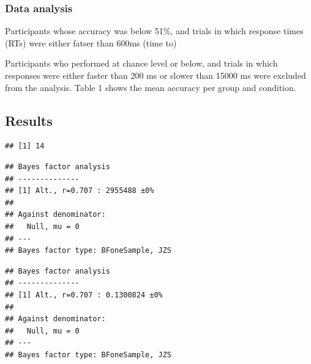 \documentclass[
  english,
  man]{apa7}
\begin{document}
\hypertarget{data-analysis}{%
\subsubsection{Data analysis}\label{data-analysis}}

Participants whose accuracy was below 51\%, and trials in which response times (RTs) were either fatser than 600ms (time to)

Participants who performed at chance level or below, and trials in which responses were either faster than 200 ms or slower than 15000 ms were excluded from the analysis. Table 1 shows the mean accuracy per group and condition.

\hypertarget{results}{%
\subsection{Results}\label{results}}

\begin{verbatim}
## [1] 14
\end{verbatim}

\begin{verbatim}
## Bayes factor analysis
## --------------
## [1] Alt., r=0.707 : 2955488 ±0%
## 
## Against denominator:
##   Null, mu = 0 
## ---
## Bayes factor type: BFoneSample, JZS
\end{verbatim}

\begin{verbatim}
## Bayes factor analysis
## --------------
## [1] Alt., r=0.707 : 0.1300824 ±0%
## 
## Against denominator:
##   Null, mu = 0 
## ---
## Bayes factor type: BFoneSample, JZS
\end{verbatim}
\end{document}
